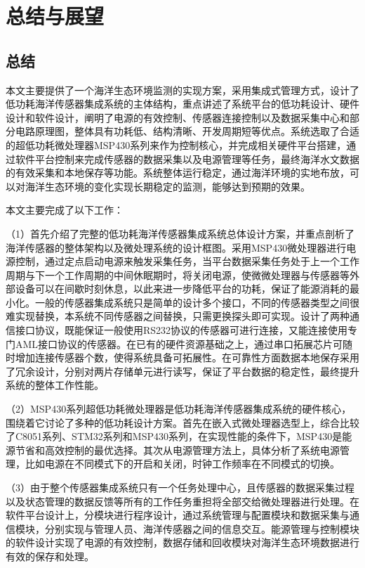 \chapter{总结与展望}
\label{cha:chapter7}

\section{总结}
本文主要提供了一个海洋生态环境监测的实现方案，采用集成式管理方式，设计了低功耗海洋传感器集成系统的主体结构，重点讲述了系统平台的低功耗设计、硬件设计和软件设计，阐明了电源的有效控制、传感器连接控制以及数据采集中心和部分电路原理图，整体具有功耗低、结构清晰、开发周期短等优点。系统选取了合适的超低功耗微处理器MSP430系列来作为控制核心，并完成相关硬件平台搭建，通过软件平台控制来完成传感器的数据采集以及电源管理等任务，最终海洋水文数据的有效采集和本地保存等功能。系统整体运行稳定，通过海洋环境的实地布放，可以对海洋生态环境的变化实现长期稳定的监测，能够达到预期的效果。

本文主要完成了以下工作：

（1）首先介绍了完整的低功耗海洋传感器集成系统总体设计方案，并重点剖析了海洋传感器的整体架构以及微处理系统的设计框图。采用MSP430微处理器进行电源控制，通过定点启动电源来触发采集任务，当平台数据采集任务处于上一个工作周期与下一个工作周期的中间休眠期时，将关闭电源，使微微处理器与传感器等外部设备可以在间歇时刻休息，以此来进一步降低平台的功耗，保证了能源消耗的最小化。一般的传感器集成系统只是简单的设计多个接口，不同的传感器类型之间很难实现替换，本系统不同传感器之间替换，只需更换探头即可实现。设计了两种通信接口协议，既能保证一般使用RS232协议的传感器可进行连接，又能连接使用专门AML接口协议的传感器。在已有的硬件资源基础之上，通过串口拓展芯片可随时增加连接传感器个数，使得系统具备可拓展性。在可靠性方面数据本地保存采用了冗余设计，分别对两片存储单元进行读写，保证了平台数据的稳定性，最终提升系统的整体工作性能。

（2）MSP430系列超低功耗微处理器是低功耗海洋传感器集成系统的硬件核心，围绕着它讨论了多种的低功耗设计方案。首先在嵌入式微处理器选型上，综合比较了C8051系列、STM32系列和MSP430系列，在实现性能的条件下，MSP430是能源节省和高效控制的最优选择。其次从电源管理方法上，具体分析了系统电源管理，比如电源在不同模式下的开启和关闭，时钟工作频率在不同模式的切换。

（3）由于整个传感器集成系统只有一个任务处理中心，且传感器的数据采集过程以及状态管理的数据反馈等所有的工作任务重担将全部交给微处理器进行处理。在软件平台设计上，分模块进行程序设计，通过系统管理与配置模块和数据采集与通信模块，分别实现与管理人员、海洋传感器之间的信息交互。能源管理与控制模块的软件设计实现了电源的有效控制，数据存储和回收模块对海洋生态环境数据进行有效的保存和处理。

